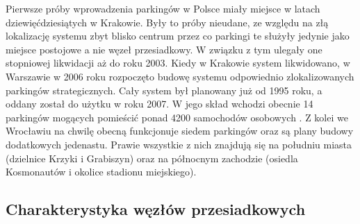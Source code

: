 \documentclass[twoside,12pt]{article}
\begin{document}
	Pierwsze próby wprowadzenia parkingów \pnr{} w Polsce miały miejsce w latach dziewięćdziesiątych w Krakowie. Były to próby nieudane, ze względu na złą lokalizację systemu zbyt blisko centrum przez co parkingi te służyły jedynie jako miejsce postojowe a nie węzeł przesiadkowy. W związku z tym ulegały one stopniowej likwidacji aż do roku 2003. Kiedy w Krakowie system likwidowano, w Warszawie w 2006 roku rozpoczęto budowę systemu odpowiednio zlokalizowanych parkingów strategicznych. Cały system był planowany już od 1995 roku, a oddany został do użytku w roku 2007. W jego skład wchodzi obecnie 14 parkingów mogących pomieścić ponad 4200 samochodów osobowych \cite{rybczynska}. Z kolei we Wrocławiu na chwilę obecną funkcjonuje siedem parkingów \pnr{} oraz są plany budowy dodatkowych jedenastu. Prawie wszystkie z nich znajdują się na południu miasta (dzielnice Krzyki i Grabiszyn) oraz na północnym zachodzie (osiedla Kosmonautów i okolice stadionu miejskiego).
	
	\clearpage
	\subsection{Charakterystyka węzłów przesiadkowych}
	
\end{document}
